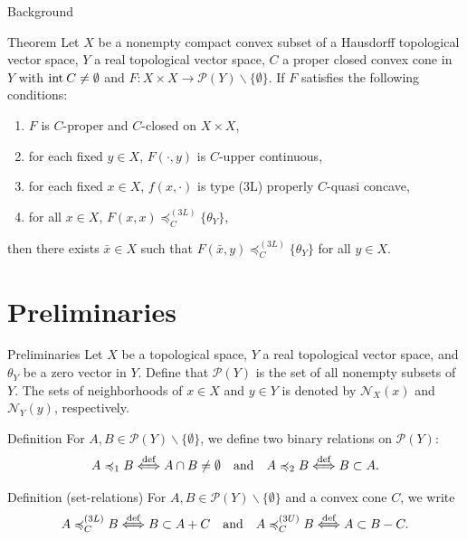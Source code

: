 \documentclass[aspectratio=169, dvipdfmx, 11pt]{beamer}
\newcommand{\Interior}[1]{\text{\rm int\:${#1}$}} %
\begin{document}
\begin{frame}{Background}
  \begin{block}{Theorem \cite{MR2778674}}
    Let $X$ be a nonempty compact convex subset of a Hausdorff topological vector space,
    $Y$ a real topological vector space, $C$ a proper closed convex cone in $Y$ with $\Interior{C} \ne \emptyset$
    and $F\colon X \times X \to \mathcal{P}(Y) \backslash \{\emptyset\}$. If $F$ satisfies the following conditions:
    \begin{enumerate}
      \item $F$ is $C$-proper and $C$-closed on $X \times X$,
      \item for each fixed $y \in X$, $F(\cdot,y)$ is $C$-upper continuous,
      \item for each fixed $x \in X$, $f(x, \cdot)$ is type (3L) properly $C$-quasi concave,
      \item for all $x \in X$, $F(x,x) \preccurlyeq_{C}^{(3L)} \{\theta_{Y}\}$,
    \end{enumerate}
    then there exists $\bar{x} \in X$ such that $F(\bar{x},y) \preccurlyeq_{C}^{(3L)} \{\theta_{Y}\}$ for all $y \in X$.
  \end{block}
\end{frame}

\section{Preliminaries}

\begin{frame}{Preliminaries}
  Let $X$ be a topological space, $Y$ a real topological vector space, and $\theta_Y$ be a zero vector in $Y$.
  Define that $\mathcal{P}(Y)$ is the set of all nonempty subsets of $Y$.
  The sets of neighborhoods of $x \in X$ and $y \in Y$ is denoted by $\mathcal{N}_X (x)$ and $\mathcal{N}_Y (y)$, respectively.

  \begin{block}{Definition}
    For $A,B \in \mathcal{P}(Y) \backslash \{\emptyset\}$, we define two binary relations on $\mathcal{P}(Y)$:
    \begin{equation}
      A \preccurlyeq_1 B \overset{\text{def}}{\Longleftrightarrow} A \cap B \ne \emptyset \quad \text{and} \quad A \preccurlyeq_2 B \overset{\text{def}}{\Longleftrightarrow} B \subset A. \notag
    \end{equation}
  \end{block}

  \begin{block}{Definition (set-relations)}
    For $A,B \in \mathcal{P}(Y) \backslash \{\emptyset\}$ and a convex cone $C$, we write
    \begin{equation}
      A \preccurlyeq_{C}^{(3L)} B \overset{\text{def}}{\Longleftrightarrow} B \subset A + C
      \quad \text{and} \quad A \preccurlyeq_{C}^{(3U)} B \overset{\text{def}}{\Longleftrightarrow} A \subset B -C. \notag
    \end{equation}
  \end{block}
\end{frame}
\end{document}

